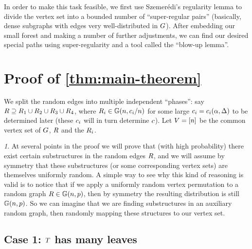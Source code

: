 \documentclass[11pt,english]{article}
\theoremstyle{plain}
\theoremstyle{plain}
\theoremstyle{plain}
\theoremstyle{plain}
\theoremstyle{plain}
\theoremstyle{definition}
\theoremstyle{definition}
\theoremstyle{remark}
\newtheorem{rem}[thm]{\protect\remarkname}
\theoremstyle{remark}
\theoremstyle{plain}
\theoremstyle{definition}
\theoremstyle{definition}
\theoremstyle{plain}
\theoremstyle{plain}
\theoremstyle{plain}
\theoremstyle{plain}
\theoremstyle{remark}
\newtheorem{myrem}[mythm]{\protect\remarkname}
\renewenvironment{rem}{\begin{myrem}}{\end{myrem}}
\theoremstyle{plain}
\theoremstyle{definition}
\let\originalleft\left
\let\originalright\right
\renewcommand{\left}{\mathopen{}\mathclose\bgroup\originalleft}
\renewcommand{\right}{\aftergroup\egroup\originalright}
\providecommand{\remarkname}{Remark}
\begin{document}
In order to make this task feasible, we first use Szemer\'edi's regularity
lemma to divide the vertex set into a bounded number of ``super-regular
pairs'' (basically, dense subgraphs with edges very well-distributed
in $G$). After embedding our small forest and making a number of
further adjustments, we can find our desired special paths using super-regularity
and a tool called the ``blow-up lemma''.


\section{Proof of \texorpdfstring{}{Theorem~}\ref{thm:main-theorem}}

We split the random edges into multiple independent ``phases'':
say $R\supseteq R_{1}\cup R_{2}\cup R_{3}\cup R_{4}$, where $\R_{i}\in\GG\left(n,\c_{i}/n\right)$
for some large $\c_{i}=\c_{i}\left(\a,\D\right)$ to be determined
later (these $c_{i}$ will in turn determine $c$). Let $V=\range n$
be the common vertex set of $G$, $R$ and the $R_{i}$.
\begin{rem}
\label{rem:symmetry}At several points in the proof we will prove
that (with high probability) there exist certain substructures in
the random edges $R$, and we will assume by symmetry that these
substructures (or some corresponding vertex sets) are themselves uniformly
random. A simple way to see why this kind of reasoning is valid is
to notice that if we apply a uniformly random vertex permutation to
a random graph $\R\in\GG\left(n,p\right)$, then by symmetry the resulting
distribution is still $\GG\left(n,p\right)$. So we can imagine that
we are finding substructures in an auxiliary random graph, then randomly
mapping these structures to our vertex set.
\end{rem}

\subsection{Case 1: $\protect T$ has many leaves\label{sub:many-leaves}}
\end{document}
